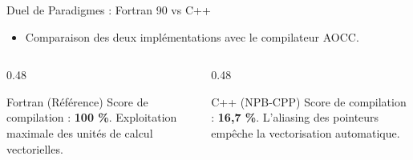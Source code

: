 \begin{frame}{Duel de Paradigmes : Fortran 90 vs C++}
    \begin{itemize}
        \fontsize{8}{9}\selectfont
        \item Comparaison des deux implémentations avec le compilateur AOCC.
    \end{itemize}
    
    
    \vspace{-0.5cm}
    \begin{columns}[T]
        \begin{column}{0.48\textwidth}
            \begin{exampleblock}{\footnotesize Fortran (Référence)}
                \fontsize{7}{8}\selectfont
                Score de compilation : \textbf{100 \%}. Exploitation maximale des unités de calcul vectorielles.
            \end{exampleblock}
        \end{column}
        \begin{column}{0.48\textwidth}
            \begin{alertblock}{\footnotesize C++ (NPB-CPP)}
                \fontsize{7}{8}\selectfont
                Score de compilation : \textbf{16,7 \%}. L'aliasing des pointeurs empêche la vectorisation automatique.
            \end{alertblock}
        \end{column}
    \end{columns}
\end{frame}